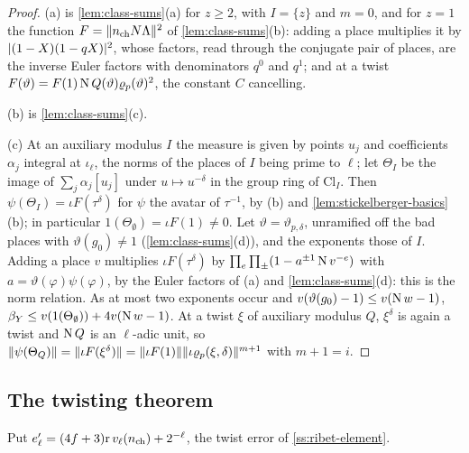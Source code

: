 \begin{proof}
(a) is \cref{lem:class-sums}(a) for $z\ge2$, with $I=\{z\}$ and $m=0$, and for $z=1$ the function $F=\lVert n_{\rm ch}N\Lambda\rVert^2$ of \cref{lem:class-sums}(b): adding a place multiplies it by $\lvert (1-X)(1-qX)\rvert^2$, whose factors, read through the conjugate pair of places, are the inverse Euler factors with denominators $q^0$ and $q^1$; and at a twist
$F(\vartheta)=F(1)\operatorname{N} Q(\vartheta)\varrho_p(\vartheta)^2$, the constant $C$ cancelling.

(b) is \cref{lem:class-sums}(c).

(c) At an auxiliary modulus $I$ the measure is given by points $u_j$ and coefficients $\alpha_j$ integral at $\iota_\ell$, the norms of the places of $I$ being prime to $\ell$; let $\Theta_I$ be the image of $\sum_j\alpha_j[u_j]$ under $u\mapsto u^{-\delta}$ in the group ring of $\mathrm{Cl}_I$. Then $\psi(\Theta_I)=\iota F(\tau^\delta)$ for $\psi$ the
avatar of $\tau^{-1}$, by (b) and \cref{lem:stickelberger-basics}(b); in particular $1(\Theta_\emptyset)=\iota F(1)\ne0$. Let $\vartheta=\vartheta_{p,\delta}$, unramified off the bad places with $\vartheta(g_0)\ne1$ (\cref{lem:class-sums}(d)), and the exponents those of $I$. Adding a place $v$ multiplies $\iota F(\tau^\delta)$ by
$\prod_e\prod_\pm(1-a^{\pm1}\operatorname{N} v^{-e})$ with $a=\vartheta(\varphi)\psi(\varphi)$, by the Euler factors of (a) and \cref{lem:class-sums}(d): this is the norm relation. As at most two exponents occur and $v(\vartheta(g_0)-1)\le v(\operatorname{N} w-1)$, $\beta_Y\le v(1(\Theta_\emptyset))+4v(\operatorname{N} w-1)$. At a twist $\xi$ of auxiliary modulus $Q$, $\xi^\delta$ is again a twist and $\operatorname{N} Q$ is an
$\ell$-adic unit, so $\lVert \psi(\Theta_Q)\rVert=\lVert \iota F(\xi^\delta)\rVert=\lVert \iota F(1)\rVert\lVert \iota\varrho_p(\xi,\delta)\rVert^{m+1}$ with $m+1=i$.
\end{proof}

\subsection{The twisting theorem}\label{ss:twisting}
Put $e'_\ell=(4f+3)\mathrm r\,v_\ell(n_{\rm ch})+2^{-\ell}$, the twist error of \cref{ss:ribet-element}.


